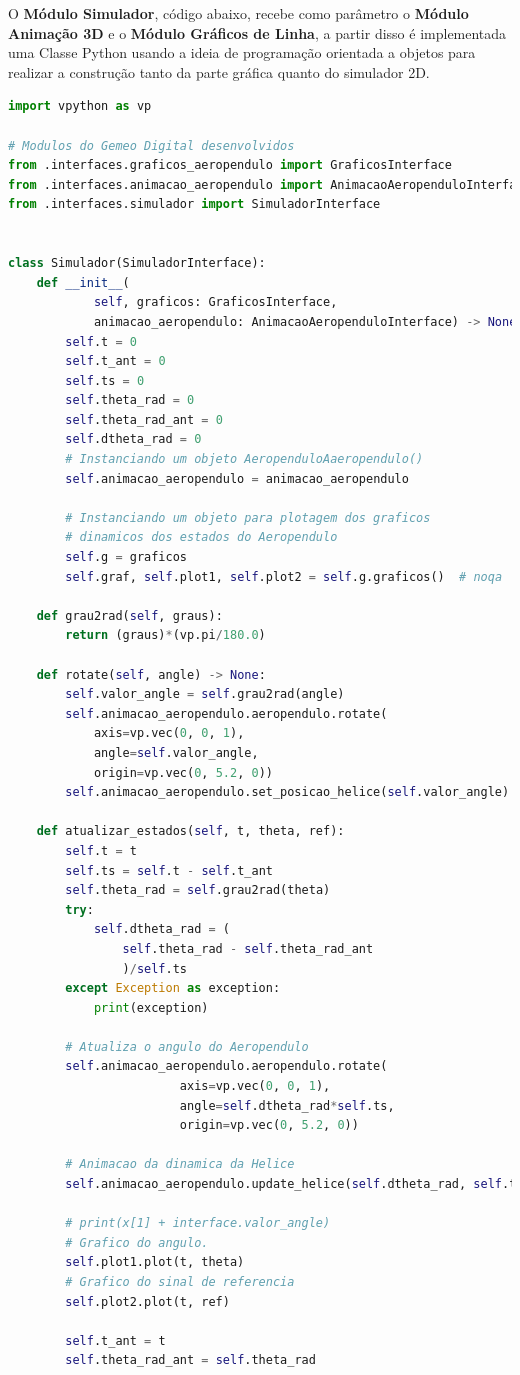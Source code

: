 \newpage

O \textbf{Módulo Simulador}, código abaixo, recebe como parâmetro  o \textbf{Módulo Animação 3D} e o \textbf{Módulo Gráficos de Linha}, a partir disso  é implementada uma Classe Python usando a ideia de programação orientada a objetos para realizar a construção tanto da parte gráfica quanto do simulador 2D.

\vspace{0.5cm}

\begin{lstlisting}[language=python]
import vpython as vp

# Modulos do Gemeo Digital desenvolvidos
from .interfaces.graficos_aeropendulo import GraficosInterface
from .interfaces.animacao_aeropendulo import AnimacaoAeropenduloInterface
from .interfaces.simulador import SimuladorInterface


class Simulador(SimuladorInterface):
    def __init__(
            self, graficos: GraficosInterface,
            animacao_aeropendulo: AnimacaoAeropenduloInterface) -> None:
        self.t = 0
        self.t_ant = 0
        self.ts = 0
        self.theta_rad = 0
        self.theta_rad_ant = 0
        self.dtheta_rad = 0
        # Instanciando um objeto AeropenduloAaeropendulo()
        self.animacao_aeropendulo = animacao_aeropendulo

        # Instanciando um objeto para plotagem dos graficos
        # dinamicos dos estados do Aeropendulo
        self.g = graficos
        self.graf, self.plot1, self.plot2 = self.g.graficos()  # noqa

    def grau2rad(self, graus):
        return (graus)*(vp.pi/180.0)

    def rotate(self, angle) -> None:
        self.valor_angle = self.grau2rad(angle)
        self.animacao_aeropendulo.aeropendulo.rotate(
            axis=vp.vec(0, 0, 1),
            angle=self.valor_angle,
            origin=vp.vec(0, 5.2, 0))
        self.animacao_aeropendulo.set_posicao_helice(self.valor_angle)

    def atualizar_estados(self, t, theta, ref):
        self.t = t
        self.ts = self.t - self.t_ant
        self.theta_rad = self.grau2rad(theta)
        try:
            self.dtheta_rad = (
                self.theta_rad - self.theta_rad_ant
                )/self.ts
        except Exception as exception:
            print(exception)

        # Atualiza o angulo do Aeropendulo
        self.animacao_aeropendulo.aeropendulo.rotate(
                        axis=vp.vec(0, 0, 1),
                        angle=self.dtheta_rad*self.ts,
                        origin=vp.vec(0, 5.2, 0))

        # Animacao da dinamica da Helice
        self.animacao_aeropendulo.update_helice(self.dtheta_rad, self.ts)

        # print(x[1] + interface.valor_angle)
        # Grafico do angulo.
        self.plot1.plot(t, theta)
        # Grafico do sinal de referencia
        self.plot2.plot(t, ref)

        self.t_ant = t
        self.theta_rad_ant = self.theta_rad

\end{lstlisting}

